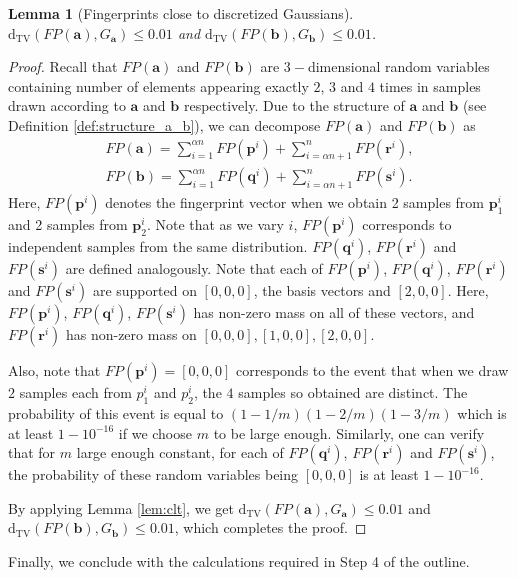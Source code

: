 \documentclass[10pt]{article} %
\theoremstyle{plain}
\newtheorem{lemma}[theorem]{Lemma}
\newcommand{\bp}{\textbf{p}}
\newcommand{\bq}{\textbf{q}}
\newcommand{\br}{\textbf{r}}
\newcommand{\bs}{\textbf{s}}
\newcommand{\dtv}{\mathrm{d_{TV}}}
\newcommand{\ba}{\textbf{a}}
\newcommand{\bb}{\textbf{b}}
\begin{document}
\begin{lemma}[Fingerprints close to discretized Gaussians]
	\label{lem:tv_fp_g}
	$\dtv(FP(\ba), G_\ba) \leq 0.01$ and $\dtv(FP(\bb), G_\bb) \leq 0.01$.
\end{lemma}
\begin{proof}
	Recall that $FP(\ba)$ and $FP(\bb)$ are $3-$dimensional random variables containing number of elements appearing exactly $2$, $3$ and $4$ times  in samples drawn according to $\ba$ and $\bb$ respectively. Due to the structure of $\ba$ and $\bb$ (see Definition \ref{def:structure_a_b}), we can decompose $FP(\ba)$ and $FP(\bb)$ as
	\begin{align*}
		FP(\ba) = \sum_{i=1}^{\alpha n} FP(\bp^i) + \sum_{i=\alpha n + 1}^n FP(\br^i),\\
		FP(\bb) = \sum_{i=1}^{\alpha n} FP(\bq^i) + \sum_{i=\alpha n + 1}^n FP(\bs^i).
	\end{align*}
	Here, $FP(\bp^i)$ denotes the fingerprint vector when we obtain 2 samples from $\bp_1^i$ and 2 samples from $\bp_2^i$. Note that as we vary $i$, $FP(\bp^i)$ corresponds to independent samples from the same distribution.
	$FP(\bq^i)$, $FP(\br^i)$ and $FP(\bs^i)$ are defined analogously. Note that each of $FP(\bp^i)$, $FP(\bq^i)$, $FP(\br^i)$ and $FP(\bs^i)$ are supported on $[0, 0, 0]$, the basis vectors and $[2, 0, 0]$. Here, $FP(\bp^i)$, $FP(\bq^i)$, $FP(\bs^i)$ has non-zero mass on all of these vectors, and $FP(\br^i)$ has non-zero mass on $[0, 0, 0], [1, 0, 0], [2, 0, 0]$.
	
	
	Also, note that $FP(\bp^i) = [0, 0, 0]$ corresponds to the event that when we draw $2$ samples each from $p_1^i$ and $p_2^i$, the $4$ samples so obtained are distinct. The probability of this event is equal to $(1-1/m)(1-2/m)(1-3/m)$ which is at least $1 - 10^{-16}$ if we choose $m$ to be large enough. Similarly, one can verify that for $m$ large enough constant, for each of $FP(\bq^i)$, $FP(\br^i)$ and $FP(\bs^i)$, the probability of these random variables being $[0, 0, 0]$ is at least $1 - 10^{-16}$.
	
	By applying Lemma \ref{lem:clt}, we get $\dtv(FP(\ba), G_\ba) \leq 0.01$ and $\dtv(FP(\bb), G_\bb) \leq 0.01$, which completes the proof.
\end{proof}

Finally, we conclude with the calculations required in Step 4 of the outline.
\end{document}

